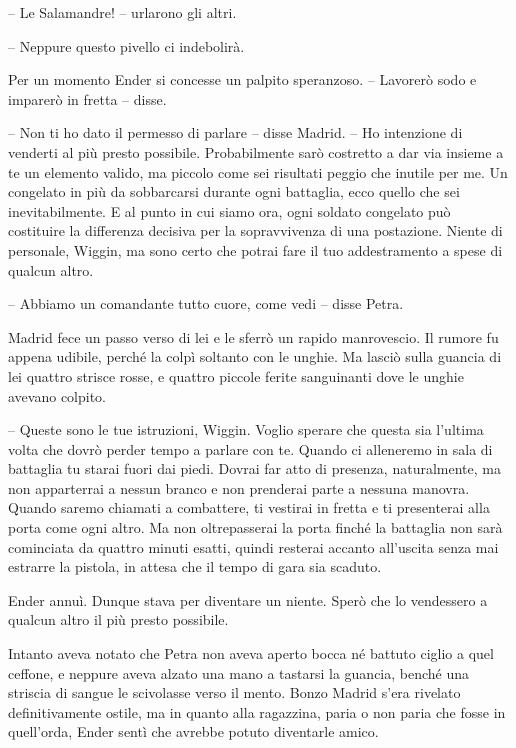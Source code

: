 {-- Le Salamandre! -- urlarono gli altri.}

{-- Neppure questo pivello ci indebolirà.}

{Per un momento Ender si concesse un palpito speranzoso. -- Lavorerò
	sodo e imparerò in fretta -- disse.}

{-- Non ti ho dato il permesso di parlare -- disse Madrid. -- Ho
	intenzione di venderti al più presto possibile. Probabilmente sarò
	costretto a dar via insieme a te un elemento valido, ma piccolo come sei
	risultati peggio che inutile per me. Un congelato in più da sobbarcarsi
	durante ogni battaglia, ecco quello che sei inevitabilmente. E al punto
	in cui siamo ora, ogni soldato congelato può costituire la differenza
	decisiva per la sopravvivenza di una postazione. Niente di personale,
	Wiggin, ma sono certo che potrai fare il tuo addestramento a spese di
	qualcun altro.}

{-- Abbiamo un comandante tutto cuore, come vedi -- disse Petra.}

{Madrid fece un passo verso di lei e le sferrò un rapido manrovescio. Il
	rumore fu appena udibile, perché la colpì soltanto con le unghie. Ma
	lasciò sulla guancia di lei quattro strisce rosse, e quattro piccole
	ferite sanguinanti dove le unghie avevano colpito.}

{-- Queste sono le tue istruzioni, Wiggin. Voglio sperare che questa sia
	l'ultima volta che dovrò perder tempo a parlare con te. Quando ci
	alleneremo in sala di battaglia tu starai fuori dai piedi. Dovrai far
	atto di presenza, naturalmente, ma non apparterrai a nessun branco e non
	prenderai parte a nessuna manovra. Quando saremo chiamati a combattere,
	ti vestirai in fretta e ti presenterai alla porta come ogni altro. Ma
	non oltrepasserai la porta finché la battaglia non sarà cominciata da
	quattro minuti esatti, quindi resterai accanto all'uscita senza mai
	estrarre la pistola, in attesa che il tempo di gara sia scaduto.}

{Ender annuì. Dunque stava per diventare un niente. Sperò che lo
	vendessero a qualcun altro il più presto possibile.}

{Intanto aveva notato che Petra non aveva aperto bocca né battuto ciglio
	a quel ceffone, e neppure aveva alzato una mano a tastarsi la guancia,
	benché una striscia di sangue le scivolasse verso il mento. Bonzo Madrid
	s'era rivelato definitivamente ostile, ma in quanto alla ragazzina,
	paria o non paria che fosse in quell'orda, Ender sentì che avrebbe
	potuto diventarle amico.}

